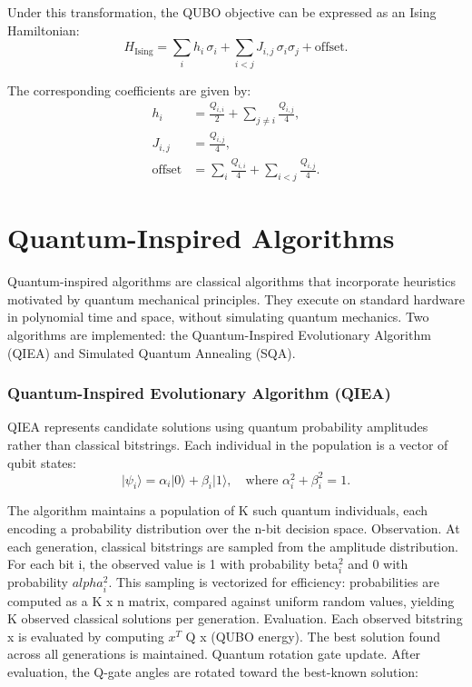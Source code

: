 Under this transformation, the QUBO objective can be expressed as an Ising Hamiltonian:
\begin{equation}
H_{\text{Ising}} = \sum_{i} h_i \, \sigma_i + \sum_{i<j} J_{i,j} \, \sigma_i \sigma_j + \text{offset}.
\end{equation}

The corresponding coefficients are given by:
\begin{align}
h_i &= \frac{Q_{i,i}}{2} + \sum_{j \neq i} \frac{Q_{i,j}}{4}, \\
J_{i,j} &= \frac{Q_{i,j}}{4}, \\
\text{offset} &= \sum_{i} \frac{Q_{i,i}}{4} + \sum_{i<j} \frac{Q_{i,j}}{4}.
\end{align}

\section{Quantum-Inspired Algorithms}
Quantum-inspired algorithms are classical algorithms that incorporate heuristics motivated by quantum mechanical principles. They execute on standard hardware in polynomial time and space, without simulating quantum mechanics. Two algorithms are implemented: the Quantum-Inspired Evolutionary Algorithm (QIEA) and Simulated Quantum Annealing (SQA).

\subsubsection{Quantum-Inspired Evolutionary Algorithm (QIEA)}
QIEA \cite{HanKim2002} represents candidate solutions using quantum probability amplitudes rather than classical bitstrings. Each individual in the population is a vector of qubit states:
\begin{equation}
\lvert \psi_i \rangle = \alpha_i \lvert 0 \rangle + \beta_i \lvert 1 \rangle, 
\quad \text{where } \alpha_i^2 + \beta_i^2 = 1.
\end{equation}

The algorithm maintains a population of K such quantum individuals, each encoding a probability distribution over the n-bit decision space.
Observation. At each generation, classical bitstrings are sampled from the amplitude distribution. For each bit i, the observed value is 1 with probability beta$_i^2$ and 0 with probability $alpha_i^2$. This sampling is vectorized for efficiency: probabilities are computed as a K x n matrix, compared against uniform random values, yielding K observed classical solutions per generation.
Evaluation. Each observed bitstring x is evaluated by computing $x^T$ Q x (QUBO energy). The best solution found across all generations is maintained.
Quantum rotation gate update. After evaluation, the Q-gate angles are rotated toward the best-known solution:

